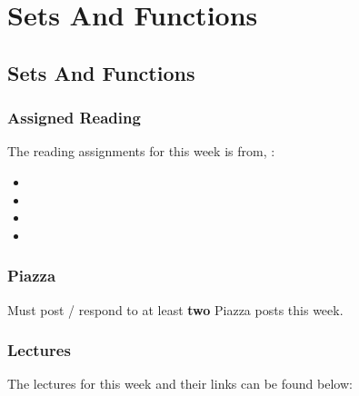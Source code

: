 \clearpage

\renewcommand{\ChapTitle}{Sets And Functions}
\renewcommand{\SectionTitle}{Sets And Functions}

\chapter{\ChapTitle}
\section{\SectionTitle}

\subsection{Assigned Reading}

The reading assignments for this week is from, \Textbook:

\begin{itemize}
    \item {}
    \item {}
    \item {}
    \item {}
\end{itemize}

\subsection{Piazza}

Must post / respond to at least \textbf{two} Piazza posts this week.

\subsection{Lectures}

The lectures for this week and their links can be found below:

